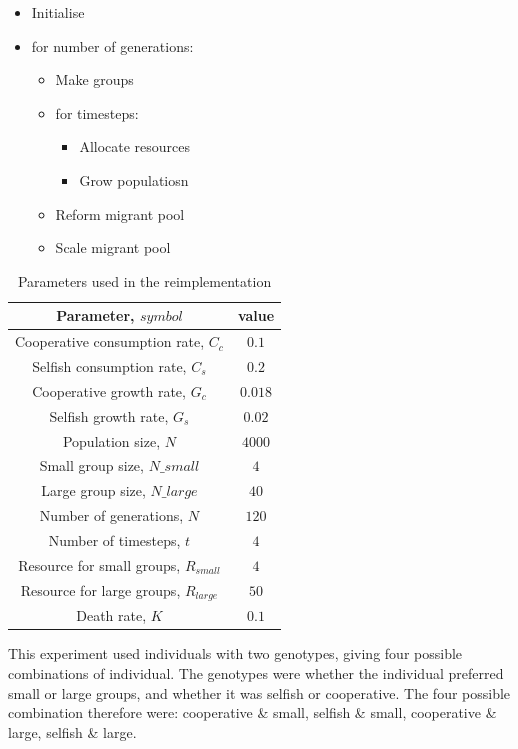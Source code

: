 \documentclass[11pt]{ecsarticle}
\begin{document}
\begin{itemize}
 \item Initialise
 \item for number of generations:
 \begin{itemize}
  \item Make groups
  \item for timesteps:
  \begin{itemize}
   \item Allocate resources
   \item Grow populatiosn
  \end{itemize}
  \item Reform migrant pool
  \item Scale migrant pool
 \end{itemize}
\end{itemize}

\begin{table}[b]
\centering
 \caption{Parameters used in the reimplementation}
 \label{table:params}
 \begin{tabular}{|c|c|}\hline
 Parameter, $symbol$ & value \\ \hline
  Cooperative consumption rate, $C_c$	&	$0.1$		\\ 
  Selfish consumption rate, $C_s$	&	$0.2$		\\ 
  Cooperative growth rate, $G_c$	&	$0.018$		\\ 
  Selfish growth rate, $G_s$		&	$0.02$		\\ 
  Population size, $N$			&	$4000$		\\ 
  Small group size, $N\_small$		&	$4$		\\ 
  Large group size, $N\_large$		&	$40$		\\ 
  Number of generations, $N$		&	$120$		\\ 
  Number of timesteps, $t$		&	$4$		\\ 
  Resource for small groups, $R_{small}$&	$4$		\\ 
  Resource for large groups, $R_{large}$&	$50$		\\ 
  Death rate, $K$			&	$0.1$		\\ \hline
 \end{tabular}
\end{table}

This experiment used individuals with two genotypes, giving four possible combinations of individual.
The genotypes were whether the individual preferred small or large groups, and whether it was selfish or cooperative.
The four possible combination therefore were: cooperative \& small, selfish \& small, cooperative \& large, selfish \& large. 
\end{document}
